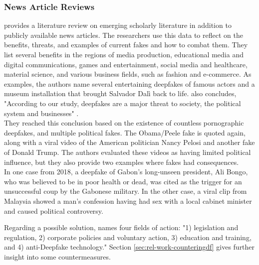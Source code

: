 \documentclass[
  a4paper,  %
  twoside,  %
  bibliography=totoc,
  headsepline,
  cleardoublepage=empty,
  parskip=half,
  draft=false
]{scrbook}
\begin{document}
\subsubsection*{News Article Reviews}
\citet{westerlundEmergenceDeepfakeTechnology2019a} provides a literature review on emerging scholarly literature in addition to publicly available news articles. The researchers use this data to reflect on the benefits, threats, and examples of current fakes and how to combat them. They list several benefits in the regions of media production, educational media and digital communications, games and entertainment, social media and healthcare, material science, and various business fields, such as fashion and e-commerce. As examples, the authors name several entertaining deepfakes of famous actors and a museum installation that brought Salvador Dalì back to life.  also concludes, "According to our study, deepfakes are a major threat to society, the political system and businesses" \cite{westerlundEmergenceDeepfakeTechnology2019a}. \\
They reached this conclusion based on the existence of countless pornographic deepfakes, and multiple political fakes. The Obama/Peele fake is quoted again, along with a viral video of the American politician Nancy Pelosi and another fake of Donald Trump. The authors evaluated these videos as having limited political influence, but they also provide two examples where fakes had consequences. \\
In one case from 2018, a deepfake of Gabon's long-unseen president, Ali Bongo, who was believed to be in poor health or dead, was cited as the trigger for an unsuccessful coup by the Gabonese military. In the other case, a viral clip from Malaysia showed a man's confession having had sex with a local cabinet minister and caused political controversy.

Regarding a possible solution,  names four fields of action: "1) legislation and regulation, 2) corporate policies and voluntary action, 3) education and training, and 4) anti-Deepfake technology." Section \ref{sec:rel-work-counteringdf} gives further insight into some countermeasures.
\end{document}
